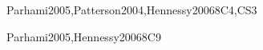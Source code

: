 \begin{syllabus}
\begin{unit}{\ARAssemblylevelmachineorganization}{}{Parhami2005,Patterson2004,Hennessy2006}{8}{C4,CS3}
\begin{learningoutcomes}
  \item \ARAssemblylevelmachineorganizationLOExplainTheTheNeumann [\Familiarity]
  \item \ARAssemblylevelmachineorganizationLODescribeHowIs [\Familiarity]
  \item \ARAssemblylevelmachineorganizationLODescribeInstruction [\Familiarity]
  \item \ARAssemblylevelmachineorganizationLOSummarize [\Familiarity]
  \item \ARAssemblylevelmachineorganizationLODemonstrateHow [\Usage]
  \item \ARAssemblylevelmachineorganizationLOExplainDifferent [\Usage]
  \item \ARAssemblylevelmachineorganizationLOExplainHowAre [\Usage]
  \item \ARAssemblylevelmachineorganizationLOExplainTheOf [\Familiarity]
  \item \ARAssemblylevelmachineorganizationLOWriteSimple [\Usage]
  \item \ARAssemblylevelmachineorganizationLOShow  [\Usage]
\end{learningoutcomes}
\end{unit}

\begin{unit}{\ARFunctionalorganization}{}{Parhami2005,Hennessy2006}{8}{C9}
\begin{topics}
      \item \ARFunctionalorganizationTopicImplementation
      \item \ARFunctionalorganizationTopicControl
      \item \ARFunctionalorganizationTopicInstruction
      \item \ARFunctionalorganizationTopicIntroductionTo
\end{topics}

\begin{learningoutcomes}
\item \ARFunctionalorganizationLOCompareAlternative [\Assessment]
\item \ARFunctionalorganizationLODiscussTheControl [\Familiarity]
\item \ARFunctionalorganizationLOExplainBasic [\Usage]
\item \ARFunctionalorganizationLODesignAnd [\Usage]
\item \ARFunctionalorganizationLODetermineFor [\Assessment]
\end{learningoutcomes}
\end{unit}


\end{syllabus}
